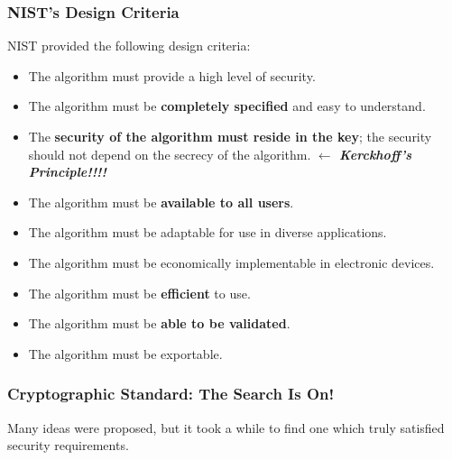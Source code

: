 \documentclass{beamer}
\newcommand{\<}{\langle}
\renewcommand{\>}{\rangle}
\begin{document}
\begin{frame}
\frametitle{NIST's Design Criteria}

NIST provided the following design criteria:\footnotesize

\begin{itemize}
\item The algorithm must provide a high level of security.
\item The algorithm must be \textbf{completely specified} and easy to understand.
\item The \textbf{security of the algorithm must reside in the key}; the security should not depend on the
secrecy of the algorithm. {\color{red}\textbf{$\leftarrow$ \emph{Kerckhoff's Principle!!!!}}}
\item The algorithm must be \textbf{available to all users}.
\item The algorithm must be adaptable for use in diverse applications.
\item The algorithm must be economically implementable in electronic devices.
\item The algorithm must be \textbf{efficient} to use.
\item The algorithm must be \textbf{able to be validated}.
\item The algorithm must be exportable.
\end{itemize}
\end{frame}


\begin{frame}
\frametitle{Cryptographic Standard: The Search Is On!}

Many ideas were proposed, but it took a while to find one which truly satisfied security requirements. 
\end{frame}
\end{document}
